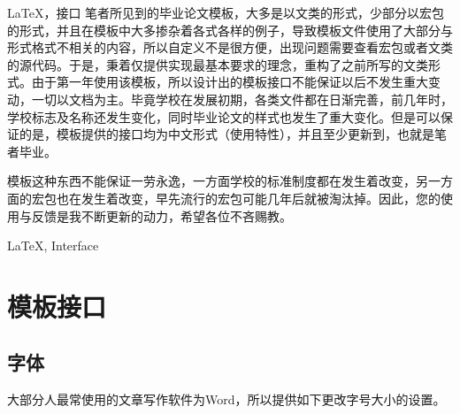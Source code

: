\documentclass[AutoFakeBold,AutoFakeSlant]{ctexart}
\begin{document}



\begin{中文摘要}{\LaTeX ，接口}
笔者所见到的毕业论文模板，大多是以文类的形式，少部分以宏包的形式，并且在模板中大多掺杂着各式各样的例子，导致模板文件使用了大部分与形式格式不相关的内容，所以自定义不是很方便，出现问题需要查看宏包或者文类的源代码。于是，秉着仅提供实现最基本要求的理念，重构了之前所写的文类形式。由于第一年使用该模板，所以设计出的模板接口不能保证以后不发生重大变动，一切以文档为主。毕竟学校在发展初期，各类文件都在日渐完善，前几年时，学校标志及名称还发生变化，同时毕业论文的样式也发生了重大变化。但是可以保证的是，模板提供的接口均为中文形式（使用特性），并且至少更新到，也就是笔者毕业。

模板这种东西不能保证一劳永逸，一方面学校的标准制度都在发生着改变，另一方面的宏包也在发生着改变，早先流行的宏包可能几年后就被淘汰掉。因此，您的使用与反馈是我不断更新的动力，希望各位不吝赐教。
\end{中文摘要}

\begin{英文摘要}{\LaTeX , Interface}
\lipsum[1]
\end{英文摘要}

\clearpage

\section{模板接口}
\subsection{字体}
大部分人最常使用的文章写作软件为Word，所以提供如下更改字号大小的设置。
\end{document}
